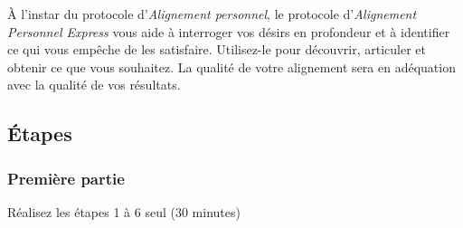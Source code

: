 \documentclass[paper=6in:9in,pagesize=pdftex,headinclude=on,footinclude=on,12pt]{scrbook}
\begin{document}
À l'instar du protocole d'\emph{Alignement personnel}, le protocole d'\emph{Ali\-gnement Personnel Express} vous aide à interroger vos désirs en profondeur
et à identifier ce qui vous empêche de les satisfaire. Utilisez-le pour découvrir, articuler et obtenir ce que vous souhaitez. La qualité de votre
alignement sera en adéquation avec la qualité de vos résultats.

\subsection{Étapes}

\subsubsection{Première partie}
Réalisez les étapes 1 à 6 seul (30 minutes)
\end{document}
